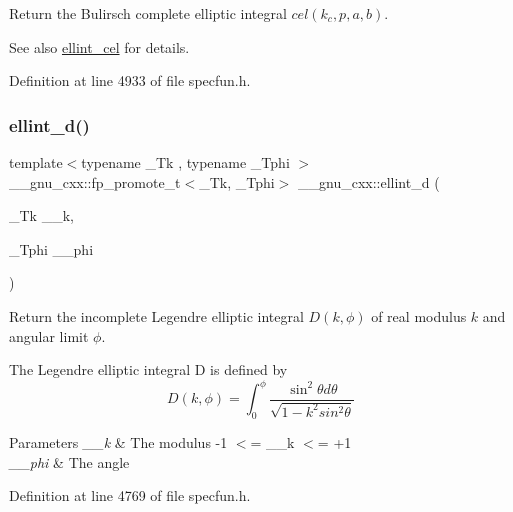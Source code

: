 Return the Bulirsch complete elliptic integral $ cel(k_c,p,a,b) $.

\begin{DoxySeeAlso}{See also}
\hyperlink{group__gnu__math__spec__func_ga6e44a0d90500e56ef4b3aba6efd7e2b0}{ellint\+\_\+cel} for details. 
\end{DoxySeeAlso}


Definition at line 4933 of file specfun.\+h.

\mbox{\label{group__gnu__math__spec__func_gad75103894786e6d7766bac4d8447b6cc}} 
\subsubsection{\texorpdfstring{ellint\+\_\+d()}{ellint\_d()}}
{\footnotesize\ttfamily template$<$typename \+\_\+\+Tk , typename \+\_\+\+Tphi $>$ \\
\+\_\+\+\_\+gnu\+\_\+cxx\+::fp\+\_\+promote\+\_\+t$<$\+\_\+\+Tk, \+\_\+\+Tphi$>$ \+\_\+\+\_\+gnu\+\_\+cxx\+::ellint\+\_\+d (\begin{DoxyParamCaption}\item[{\+\_\+\+Tk}]{\+\_\+\+\_\+k,  }\item[{\+\_\+\+Tphi}]{\+\_\+\+\_\+phi }\end{DoxyParamCaption})\hspace{0.3cm}{\ttfamily [inline]}}

Return the incomplete Legendre elliptic integral $ D(k,\phi) $ of real modulus $ k $ and angular limit $ \phi $.

The Legendre elliptic integral D is defined by \[ D(k,\phi) = \int_0^\phi \frac{\sin^2\theta d\theta}{\sqrt{1-k^2sin^2\theta}} \]


\begin{DoxyParams}{Parameters}
{\em \+\_\+\+\_\+k} & The modulus {\ttfamily -\/1 $<$= \+\_\+\+\_\+k $<$= +1} \\
\hline
{\em \+\_\+\+\_\+phi} & The angle \\
\hline
\end{DoxyParams}


Definition at line 4769 of file specfun.\+h.

\mbox{\label{group__gnu__math__spec__func_ga02ed50be21fdd84ad6bed003f94a9e69}} 
